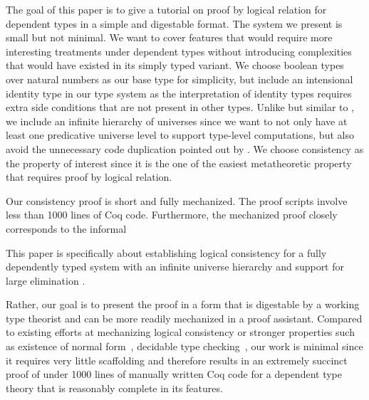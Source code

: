 \documentclass[nonacm]{acmart}
\begin{document}
The goal of this paper is to give a tutorial on proof by logical relation for
dependent types in a simple and digestable format. %
The system we present is small but not minimal. We want to cover
features that would require more interesting treatments under
dependent types without introducing complexities that would have
existed in its simply typed variant. We choose boolean
types over natural numbers as our base type for simplicity, but include an
intensional identity type in our type system as the interpretation
of identity types requires extra side conditions that are not present
in other types. Unlike \citet{nbeincoq,decagda,martin-lof-a-la-coq}
but similar to \citet{anand2014towards}, we include an infinite
hierarchy of universes since we want to not only have at least one
predicative universe level to support type-level computations, but
also avoid the unnecessary code duplication pointed out by
\citet{nbeincoq}.
We choose consistency as the property of interest since it is the one
of the easiest metatheoretic property that requires proof by logical
relation.

Our consistency proof is short and fully mechanized. The proof scripts
involve less than 1000 lines of Coq code. Furthermore, the mechanized
proof closely corresponds to the informal






This paper is specifically
about establishing logical consistency for a fully dependently typed
system with an infinite universe hierarchy and support for large
elimination . %


Rather,
our goal is to present the proof in a form that is digestable by a
working type theorist and can be more readily mechanized in a proof
assistant. Compared to existing efforts at mechanizing logical
consistency or stronger properties such as existence of normal
form~\citep{nbeincoq},
decidable type checking~\citep{decagda}, our work is minimal since it requires very
little scaffolding and therefore results in an extremely succinct
proof of under 1000 lines of manually written Coq code for a dependent
type theory that is reasonably complete in its features.
\end{document}
